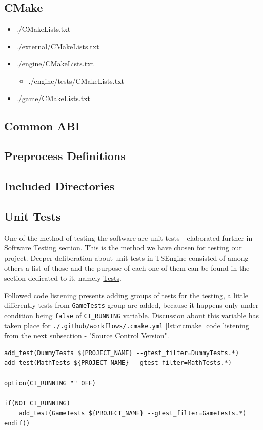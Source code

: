 \subsection{CMake}
\begin{itemize}
    \item ./CMakeLists.txt
    \item ./external/CMakeLists.txt
    \item ./engine/CMakeLists.txt
        \begin{itemize}
            \item ./engine/tests/CMakeLists.txt
        \end{itemize}
    \item ./game/CMakeLists.txt
\end{itemize}

\subsection{Common ABI}
\label{sec:abi}

\subsection{Preprocess Definitions}

\subsection{Included Directories}

\subsection{Unit Tests}
\label{sec:build_unit_tests}
One of the method of testing the software are unit tests - elaborated further in \hyperref[sec:testing]{Software Testing section}. This is the method we have chosen for testing our project.
Deeper deliberation about unit tests in TSEngine consisted of among others a list of those and the purpose of each one of them can be found in the section dedicated to it, namely \hyperref[sec:tests]{Tests}.

Followed code listening presents adding groups of tests for the testing, a little differently tests from \texttt{GameTests} group are added, because it happens only under condition being \texttt{false} of \texttt{CI\_RUNNING} variable.
Discussion about this variable has taken place for \texttt{./.github/workflows/.cmake.yml} \ref{lst:cicmake} code listening from the next subsection - \hyperref[sec:scv]{"Source Control Version"}.
\begin{lstlisting}[caption=Adding tests to CTest (./engine/CMakeLists.txt)]
add_test(DummyTests ${PROJECT_NAME} --gtest_filter=DummyTests.*)
add_test(MathTests ${PROJECT_NAME} --gtest_filter=MathTests.*)

option(CI_RUNNING "" OFF)

if(NOT CI_RUNNING)
    add_test(GameTests ${PROJECT_NAME} --gtest_filter=GameTests.*)
endif()
\end{lstlisting}

